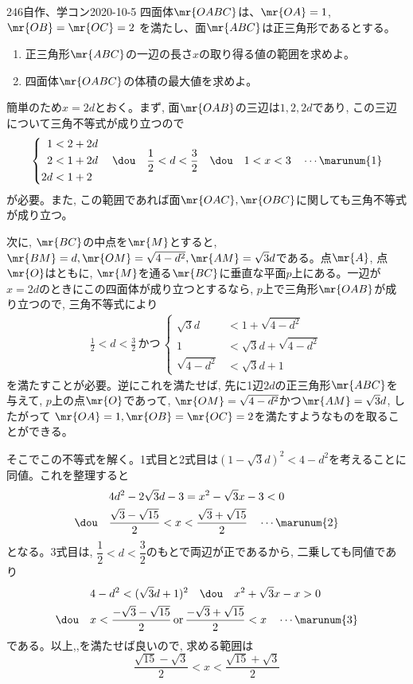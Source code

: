 \begin{prob}{246}{}{自作、学コン2020-10-5}
 四面体$\mr{OABC}$は、$\mr{OA}=1$, $\mr{OB}=\mr{OC}=2$ を満たし、面$\mr{ABC}$は正三角形であるとする。
 \begin{enumerate}
  \item 正三角形$\mr{ABC}$の一辺の長さ$x$の取り得る値の範囲を求めよ。
  \item 四面体$\mr{OABC}$の体積の最大値を求めよ。
 \end{enumerate}
\end{prob}

簡単のため$x=2d$とおく。まず, 面$\mr{OAB}$の三辺は$1,2,2d$であり, この三辺について三角不等式が成り立つので 
\begin{align*}
 \left\{
 \begin{aligned}
  1&<2+2d \\
  2&<1+2d \\
  2d&<1+2
 \end{aligned}
 \right. \quad\dou\quad \frac{1}{2}<d<\frac{3}{2} \quad\dou\quad 1<x<3 \quad \cdots\marunum{1}
\end{align*}
が必要。また, この範囲であれば面$\mr{OAC}, \mr{OBC}$に関しても三角不等式が成り立つ。

次に, $\mr{BC}$の中点を$\mr{M}$とすると, $\mr{BM}=d, \mr{OM}=\sqrt{4-d^{2}}, \mr{AM}=\sqrt{3}d$である。点$\mr{A}$, 点$\mr{O}$はともに, $\mr{M}$を通る$\mr{BC}$に垂直な平面$p$上にある。一辺が$x=2d$のときにこの四面体が成り立つとするなら, $p$上で三角形$\mr{OAB}$が成り立つので, 三角不等式により
\begin{align*}
 \frac{1}{2}<d<\frac{3}{2} \,\text{かつ}\,\left\{
 \begin{aligned}
  \sqrt{3}d&<1+\sqrt{4-d^2} \\
  1&<\sqrt{3}d+\sqrt{4-d^2} \\
  \sqrt{4-d^2}&<\sqrt{3}d+1
 \end{aligned}
 \right.
\end{align*}
を満たすことが必要。逆にこれを満たせば, 先に1辺$2d$の正三角形$\mr{ABC}$を与えて, $p$上の点$\mr{O}$であって, $\mr{OM}=\sqrt{4-d^{2}}$かつ$\mr{AM}=\sqrt{3}d$, したがって $\mr{OA}=1, \mr{OB}=\mr{OC}=2$を満たすようなものを取ることができる。

そこでこの不等式を解く。1式目と2式目は$(1-\sqrt{3}d)^{2} < 4-d^{2}$を考えることに同値。これを整理すると
\begin{align*}
 & 4d^2-2\sqrt{3}d-3=x^2-\sqrt{3}x-3 <0 \\
 \dou\quad &\frac{\sqrt{3}-\sqrt{15}}{2}<x<\frac{\sqrt{3}+\sqrt{15}}{2} \quad\cdots\marunum{2}
\end{align*}
となる。3式目は, $\dfrac{1}{2}< d < \dfrac{3}{2}$のもとで両辺が正であるから, 二乗しても同値であり
\begin{align*}
 & 4-d^2<(\sqrt{3}d+1)^2 \quad\dou\quad x^2+\sqrt{3}x-x>0 \\
 \dou\quad & x<\frac{-\sqrt{3}-\sqrt{15}}{2} \,\text{or}\, \frac{-\sqrt{3}+\sqrt{15}}{2} < x \quad\cdots\marunum{3}
\end{align*}
である。以上,,を満たせば良いので, 求める範囲は
\[ \dfrac{\sqrt{15}-\sqrt{3}}{2} < x  < \dfrac{\sqrt{15}+\sqrt{3}}{2} \]

